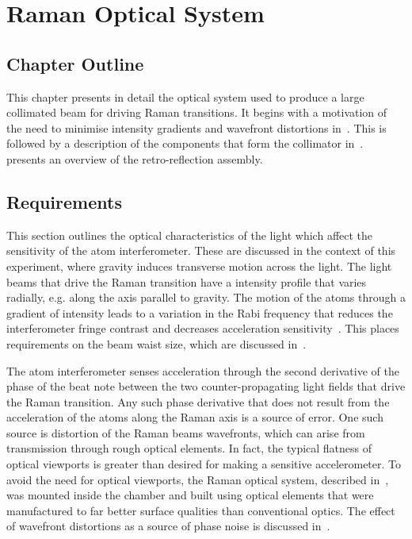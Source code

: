 \chapter{Raman Optical System}\label{chap:raman_optics}

\section{Chapter Outline}
This chapter presents in detail the optical system used to produce a
large collimated beam for driving Raman transitions. It begins with a
motivation of the need to minimise intensity gradients and wavefront distortions 
in~. This is followed by a description
of the components that form the collimator
in~.
 presents an overview of the
retro-reflection assembly.
\section{Requirements}\label{sec:wavefront_req}
This section
outlines the optical characteristics of the light which affect the
sensitivity of the atom interferometer. These are discussed in the
context of this experiment, where gravity induces transverse motion
across the light. The light beams that drive the Raman transition have
a intensity profile that varies radially, e.g. along the axis parallel
to gravity. The motion of the atoms through
a gradient of intensity leads to a variation in the Rabi frequency that reduces the interferometer fringe
contrast and decreases acceleration sensitivity~\cite{Kim2017}.
This places requirements on the beam waist size, which are discussed
in~. 
\par\noindent
The atom interferometer senses acceleration through the second
derivative of the phase of the beat note between the two
counter-propagating light fields that drive the Raman transition. Any
such phase derivative that does not result from the acceleration of the atoms along
the Raman axis is a source of error.
One such source is distortion of the Raman beams wavefronts, which can
arise from transmission through rough optical elements.
In fact, the typical flatness of optical viewports is greater than
desired for making a sensitive accelerometer. To avoid the need for
optical viewports, the Raman optical system, described
in~, was mounted inside the
chamber and built using optical elements that were manufactured to
far better surface
qualities than conventional optics. 
The effect of wavefront distortions as a source of phase noise is
discussed in~.
